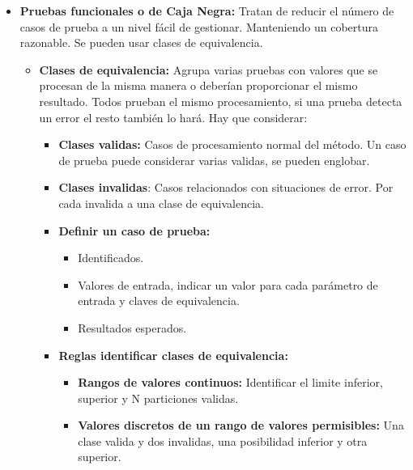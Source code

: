 \documentclass[12pt, twoside, openright]{report} %
\begin{document}
\begin{itemize}
\item \textbf{Pruebas funcionales o de Caja Negra:} Tratan de reducir el
  número de casos de prueba a un nivel fácil de gestionar. Manteniendo
  un cobertura razonable. Se pueden usar clases de equivalencia.
  

  \begin{itemize}
  \item \textbf{Clases de equivalencia:} Agrupa varias pruebas con valores
    que se procesan de la misma manera o deberían proporcionar el mismo
    resultado. Todos prueban el mismo procesamiento, si una prueba
    detecta un error el resto también lo hará. Hay que considerar:
    

    \begin{itemize}
    \item \textbf{Clases validas:} Casos de procesamiento normal del método.
      Un caso de prueba puede considerar varias validas, se pueden
      englobar.
      
    \item \textbf{Clases invalidas}: Casos relacionados con situaciones de
      error. Por cada invalida a una clase de equivalencia.
      
    \item \textbf{Definir un caso de prueba:}
      

      \begin{itemize}
      \item Identificados.
        
      \item Valores de entrada, indicar un valor para cada parámetro de
        entrada y claves de equivalencia.
        
      \item Resultados esperados.
        
      \end{itemize}
    \item \textbf{Reglas identificar clases de equivalencia:}
      

      \begin{itemize}
      \item \textbf{Rangos de valores continuos:} Identificar el limite
        inferior, superior y N particiones validas.
        
      \item \textbf{Valores discretos de un rango de valores permisibles:}
        Una clase valida y dos invalidas, una posibilidad inferior y
        otra superior.
        

\end{itemize}
\end{itemize}
\end{itemize}
\end{itemize}
\end{document}
